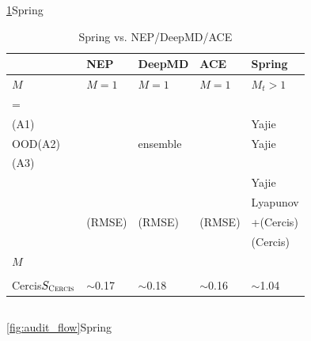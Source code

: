 \documentclass[12pt,a4paper]{article}
\theoremstyle{remark}
\newcommand{\Cercis}{\textsc{Cercis}}
\begin{document}
\ref{tab:full_comparison}Spring

\begin{table}[H]
\centering
\caption{Spring vs. NEP/DeepMD/ACE}
\label{tab:full_comparison}
\renewcommand{\arraystretch}{1.3}
\small
\begin{tabular}{@{}p{2.5cm} p{3cm} p{3cm} p{3cm} p{3.5cm}@{}}
\toprule
\textbf{} & \textbf{NEP} & \textbf{DeepMD} & \textbf{ACE} & \textbf{Spring} \\
\midrule
$M$ & $M=1$ & $M=1$ & $M=1$ & $M_t > 1$ \\
\midrule
= &  &  &  & \textbf{} \\
\midrule
(A1) &  &  &  & Yajie \\
\midrule
OOD(A2) &  & ensemble &  & Yajie \\
\midrule
(A3) &  &  &  &  \\
\midrule
 &  &  &  & Yajie \\
\midrule
 &  &  &  & Lyapunov \\
\midrule
 & (RMSE) & (RMSE) & (RMSE) & +(Cercis) \\
\midrule
 &  &  &  & (Cercis) \\
\midrule
$M$ &  &  &  &  \\
\midrule
 &  &  &  &  \\
\midrule
Cercis$S_{\Cercis}$ & $\sim$0.17 & $\sim$0.18 & $\sim$0.16 & $\sim$1.04 \\
\bottomrule
\end{tabular}
\end{table}

\subsection{}

\ref{fig:audit_flow}Spring
\end{document}
